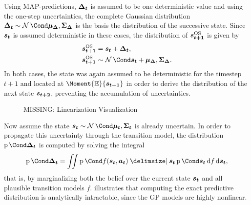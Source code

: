 Using MAP-predictions, $\bm{\Delta_t}$ is assumed to be one deterministic value and using the one-step uncertainties, the complete Gaussian distribution $\rv{\Delta_t} \sim \Gaussian{\mat{\mu_\Delta}, \mat{\Sigma_\Delta}}$ is the basis the distribution of the successive state.
Since $\bm{s_t}$ is assumed deterministic in these cases, the distribution of $\bm{s_{t+1}}^{\text{OS}}$ is given by
\begin{align}
    \os{\rv{s_{t+1}}} &= \mat{s_t} + \rv{\Delta_t}, \\
    \os{\rv{s_{t+1}}} &\sim \Gaussian{\mat{s_t} + \mat{\mu_\Delta}, \mat{\Sigma_\Delta}}.
\end{align}
In both cases, the state was again assumed to be deterministic for the timestep $t+1$ and located at $\Moment{\E}{\rv{s_{t+1}}}$ in order to derive the distribution of the next state $\bm{s_{t+2}}$, preventing the accumulation of uncertainties.

\begin{figure}[t]
    \centering
    \caption{MISSING: Linearization Visualization}
    \label{fig:linearization}
\end{figure}
Now assume the state $\rv{s_t} \sim \Gaussian{\mat{\mu_t}, \mat{\Sigma_t}}$ is already uncertain.
In order to propagate this uncertainty through the transition model, the distribution $\Prob{\rv{\Delta_t}}$ is computed by solving the integral
\begin{align}
    \Prob{\rv{\Delta_t}} = \iint \Prob{f(\rv{s_t}, \mat{a_t}) \given \rv{s_t}} \Prob{\rv{s_t}} \diff f \diff \rv{s_t},
\end{align}
that is, by marginalizing both the belief over the current state $\bm{s_t}$ and all plausible transition models $f$.
 illustrates that computing the exact predictive distribution is analytically intractable, since the GP models are highly nonlinear.

